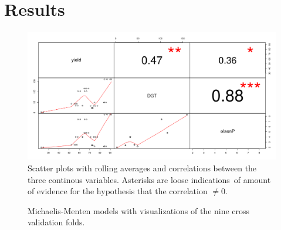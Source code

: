 \documentclass[11pt,fleqn]{article}
\begin{document}
\section{Results}
\begin{figure}[H]
	\centering
	\includegraphics[width=.75\linewidth]{p2_corrplot}
	\caption{Scatter plots with rolling averages and correlations between the three continous variables. Asterisks are loose indications\protect\footnotemark\ of amount of evidence for the hypothesis that the correlation \(\neq 0\).}
\end{figure}
\begin{figure}[H]
	\centering
{}
	\label{fig:yield_bio}
\caption{Michaelis-Menten models with visualizations of the nine cross validation folds.}
\end{figure}
\end{document}
